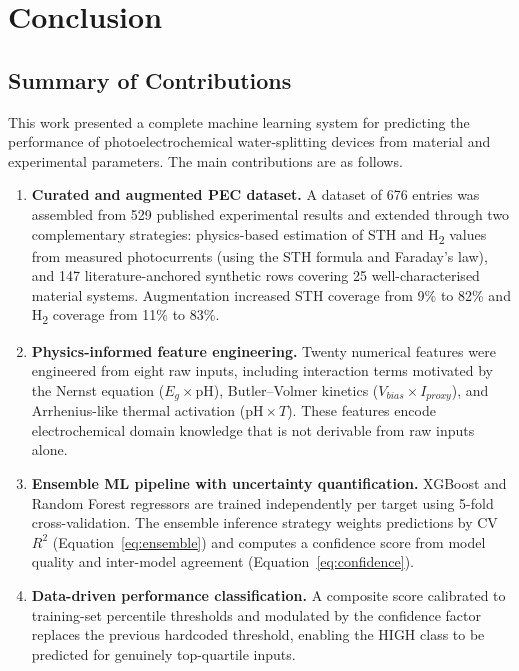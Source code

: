\chapter{Conclusion}\label{ch:concl}

\section{Summary of Contributions}

This work presented a complete machine learning system for predicting the
performance of photoelectrochemical water-splitting devices from material and
experimental parameters.
The main contributions are as follows.

\begin{enumerate}
  \item \textbf{Curated and augmented PEC dataset.}
        A dataset of 676 entries was assembled from 529 published experimental
        results and extended through two complementary strategies: physics-based
        estimation of STH and H\textsubscript{2} values from measured photocurrents
        (using the STH formula and Faraday's law), and 147 literature-anchored
        synthetic rows covering 25 well-characterised material systems.
        Augmentation increased STH coverage from 9\% to 82\% and
        H\textsubscript{2} coverage from 11\% to 83\%.

  \item \textbf{Physics-informed feature engineering.}
        Twenty numerical features were engineered from eight raw inputs,
        including interaction terms motivated by the Nernst equation
        ($E_g \times \mathrm{pH}$), Butler--Volmer kinetics
        ($V_{bias} \times I_{proxy}$), and Arrhenius-like thermal activation
        ($\mathrm{pH} \times T$).
        These features encode electrochemical domain knowledge that is not
        derivable from raw inputs alone.

  \item \textbf{Ensemble ML pipeline with uncertainty quantification.}
        XGBoost and Random Forest regressors are trained independently per
        target using 5-fold cross-validation.
        The ensemble inference strategy weights predictions by CV $R^2$
        (Equation~\eqref{eq:ensemble}) and computes a confidence score from
        model quality and inter-model agreement (Equation~\eqref{eq:confidence}).

  \item \textbf{Data-driven performance classification.}
        A composite score calibrated to training-set percentile thresholds
        and modulated by the confidence factor replaces the previous
        hardcoded threshold, enabling the HIGH class to be predicted for
        genuinely top-quartile inputs.


\end{enumerate}
